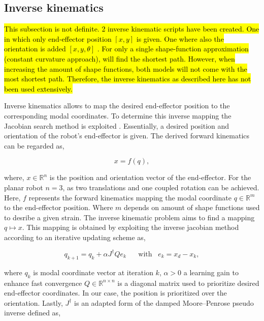 \subsection{Inverse kinematics}

\hl{This subsection is not definite. 2 inverse kinematic scripts have been created. One in which only end-effector position $[x,y]$ is given. One where also the orientation is added $[x,y,\theta]$ . For only a single shape-function approximation (constant curvature approach), will find the shortest path. However, when increasing the amount of shape functions, both models will not come with the most shortest path. Therefore, the inverse kinematics as described here has not been used extensively.}


Inverse kinematics allows to map the desired end-effector position to the corresponding modal coordinates. To determine this inverse mapping the Jacobian search method is exploited \cite{JacobianInverse}. Essentially, a desired position and orientation of the robot's end-effector is given. The derived forward kinematics can be regarded as,

\begin{equation}
    x = f(q),
\end{equation}

where, $x \in \mathbb{R}^n$ is the position and orientation vector of the end-effector. For the planar robot $n = 3$, as two translations and one coupled rotation can be achieved. Here, $f$ represents the forward kinematics mapping the modal coordinate $q \in \mathbb{R}^m$ to the end-effector position. Where $m$ depends on amount of shape functions used to desribe a given strain. The inverse kinematic problem aims to find a mapping $q\mapsto x$. This mapping is obtained by exploiting the inverse jacobian method according to an iterative updating scheme as,

\begin{equation}
    q_{k+1} = q_k + \alpha J^\dagger Q e_k \hspace{20pt} \text{with} \hspace{10pt}  e_k = x_d - x_k,
    \label{eq2:qupdate}
\end{equation}

where $q_k$ is modal coordinate vector at iteration $k$, $\alpha > 0$ a learning gain to enhance fast convergence $Q \in \mathbb{R}^{n\times n}$ is a diagonal matrix used to prioritize desired end-effector coordinates. In our case, the position is prioritized over the orientation. Lastly, $J^\dagger$ is an adapted form of the damped Moore–Penrose pseudo inverse defined as,

